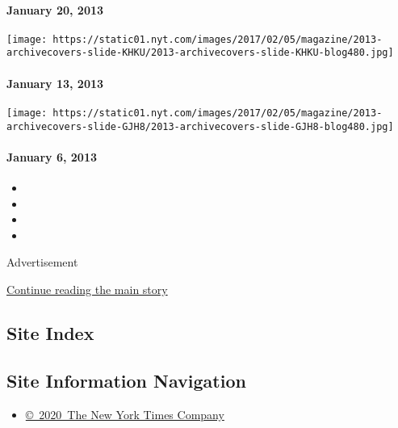 \hypertarget{january-20-2013}{%
\paragraph{January 20, 2013}\label{january-20-2013}}

\href{http://www.nytimes.com/indexes/2013/01/13/magazine/index.html}{}

\texttt{[image: https://static01.nyt.com/images/2017/02/05/magazine/2013-archivecovers-slide-KHKU/2013-archivecovers-slide-KHKU-blog480.jpg]}

\hypertarget{january-13-2013}{%
\paragraph{January 13, 2013}\label{january-13-2013}}

\href{http://www.nytimes.com/indexes/2013/01/06/magazine/index.html}{}

\texttt{[image: https://static01.nyt.com/images/2017/02/05/magazine/2013-archivecovers-slide-GJH8/2013-archivecovers-slide-GJH8-blog480.jpg]}

\hypertarget{january-6-2013}{%
\paragraph{January 6, 2013}\label{january-6-2013}}

\begin{itemize}
\item
\item
\item
\item
\end{itemize}

Advertisement

\protect\hyperlink{after-bottom}{Continue reading the main story}

\hypertarget{site-index}{%
\subsection{Site Index}\label{site-index}}

\hypertarget{site-information-navigation}{%
\subsection{Site Information
Navigation}\label{site-information-navigation}}

\begin{itemize}
\tightlist
\item
  \href{https://help.nytimes.com/hc/en-us/articles/115014792127-Copyright-notice}{©~2020~The
  New York Times Company}
\end{itemize}

